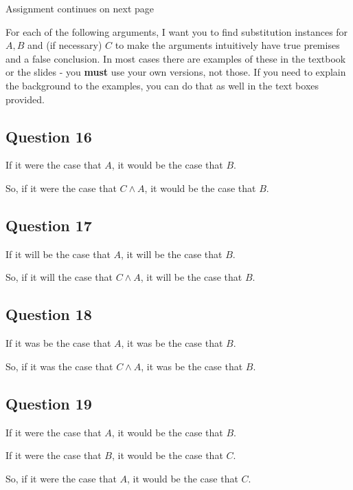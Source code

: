 Assignment continues on next page

\newpage

For each of the following arguments, I want you to find substitution instances for $A, B$ and (if necessary) $C$ to make the arguments intuitively have true premises and a false conclusion. In most cases there are examples of these in the textbook or the slides - you \textbf{must} use your own versions, not those. If you need to explain the background to the examples, you can do that as well in the text boxes provided.

\subsection*{Question 16}
\begin{enumerate*}
\item If it were the case that $A$, it would be the case that $B$.
\item So, if it were the case that $C \wedge A$, it would be the case that $B$.
\end{enumerate*}

\subsection*{Question 17}
\begin{enumerate*}
\item If it will be the case that $A$, it will be the case that $B$.
\item So, if it will the case that $C \wedge A$, it will be the case that $B$.
\end{enumerate*}

\subsection*{Question 18}
\begin{enumerate*}
\item If it was be the case that $A$, it was be the case that $B$.
\item So, if it was the case that $C \wedge A$, it was be the case that $B$.
\end{enumerate*}

\subsection*{Question 19}
\begin{enumerate*}
\item If it were the case that $A$, it would be the case that $B$.
\item If it were the case that $B$, it would be the case that $C$.
\item So, if it were the case that $A$, it would be the case that $C$.
\end{enumerate*}


